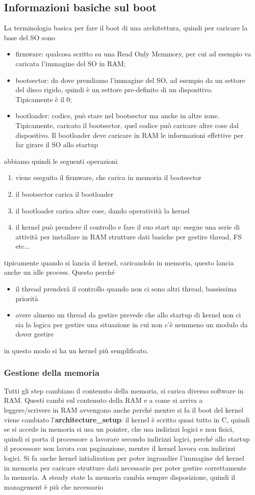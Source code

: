 \documentclass[12pt, oneside]{extbook}
\begin{document}
\subsection{Informazioni basiche sul boot}
La terminologia basica per fare il boot di una architettura, quindi per caricare la base del SO sono
\begin{itemize}
\item firmware: qualcosa scritto su una Read Only Memmory, per cui ad esempio va caricata l'immagine del SO in RAM;
\item bootsector: da dove prendiamo l'immagine del SO, ad esempio da un settore del disco rigido, quindi è un settore pre-definito di un dispositivo. Tipicamente è il 0;
\item bootloader: codice, può stare nel bootsector ma anche in altre zone. Tipicamente, caricato il bootsector, quel codice può caricare altre cose dal dispositivo. Il bootloader deve caricare in RAM le informazioni effettive per far girare il SO allo startup
\end{itemize}
abbiamo quindi le seguenti operazioni
\begin{enumerate}
\item viene eseguito il firmware, che carica in memoria il bootsector
\item il bootsector carica il bootloader
\item il bootloader carica altre cose, dando operatività la kernel
\item il kernel può prendere il controllo e fare il suo start up: esegue una serie di attività per installare in RAM strutture dati basiche per gestire thread, FS etc...
\end{enumerate}
tipicamente quando si lancia il kernel, caricandolo in memoria, questo lancia anche un idle process. Questo perché 
\begin{itemize}
\item il thread prenderà il controllo quando non ci sono altri thread, bassissima priorità
\item avere almeno un thread da gestire prevede che allo startup di kernel non ci sia la logica per gestire una situazione in cui non c'è nemmeno un modulo da dover gestire
\end{itemize}
in questo modo si ha un kernel più semplificato.
\subsubsection{Gestione della memoria}
Tutti gli step cambiano il contenuto della memoria, si carica diverso software in RAM. Questi cambi sul contenuto della RAM e a come si arriva a leggere/scrivere in RAM avvengono anche perché mentre si fa il boot del kernel viene cambiato l'\textbf{architecture\_setup}: il kernel è scritto quasi tutto in C, quindi se si accede in memoria si usa un pointer, che usa indirizzi logici e non fisici, quindi si porta il processore a lavorare secondo indirizzi logici, perché allo startup il processore non lavora con paginazione, mentre il kernel lavora con indirizzi logici. Si fa anche kernel intialization per poter ingrandire l'immagine del kernel in memoria per caricare strutture dati necessarie per poter gestire correttamente la memoria. A steady state la memoria cambia sempre disposizione, quindi il management è più che necessario
\end{document}
